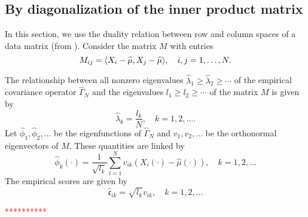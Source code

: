 
\subsection{By diagonalization of the inner product matrix} %
\label{sub:by_diagonalization_of_the_inner_product_matrix}

In this section, we use the duality relation between row and column spaces of a data matrix (from \cite{benkoCommonFunctionalPrincipal2009}). Consider the matrix $M$ with entries
\begin{equation}\label{eq:m_entries}
    M_{ij} = \langle X_i - \widehat{\mu}, X_j - \widehat{\mu}\rangle, \quad i, j = 1, \dots, N.
\end{equation}

The relationship between all nonzero eigenvalues $\widehat{\lambda}_1 \geq \widehat{\lambda}_2 \geq \cdots$ of the empirical covariance operator $\widehat{\Gamma}_N$ and the eigenvalues $l_1 \geq l_2 \geq \cdots$ of the matrix $M$ is given by
\begin{equation}\label{eq:eigenvalues_relation}
    \widehat{\lambda}_k = \frac{l_k}{N}, \quad k = 1, 2, \dots.
\end{equation}
Let $\widehat{\phi}_1, \widehat{\phi}_2, \dots$ be the eigenfunctions of $\widehat{\Gamma}_N$ and $v_1, v_2, \dots$ be the orthonormal eigenvectors of $M$. These quantities are linked by
\begin{equation}\label{eq:eigenfunction_relation}
    \widehat{\phi}_k(\cdot) = \frac{1}{\sqrt{l_k}}\sum_{i = 1}^N v_{ik}(X_i(\cdot) - \widehat{\mu}(\cdot)), \quad k = 1, 2, \dots 
\end{equation}
The empirical scores are given by
\begin{equation}\label{eq:scores_relation}
    \widehat{\mathfrak{c}}_{ik} = \sqrt{l_k}v_{ik}, \quad k = 1, 2, \dots 
\end{equation}

\textcolor{red}{**********}

